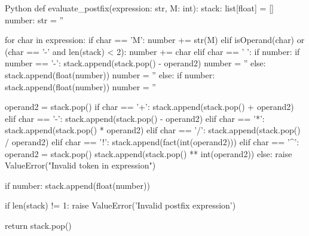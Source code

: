     \begin{code}{Python}
        def evaluate_postfix(expression: str, M: int):
            stack: list[float] = []
            number: str = ''
        
            for char in expression:
                if char == 'M': 
                    number += str(M)
                elif isOperand(char) or (char == '-' and len(stack) < 2):
                    number += char
                elif char == ' ':
                    if number:
                        if number == '-':
                            stack.append(stack.pop() - operand2)
                            number = ''
                        else:
                            stack.append(float(number))
                            number = ''
                else:
                    if number:
                        stack.append(float(number))
                        number = ''
        
                    operand2 = stack.pop()
                    if char == '+':
                        stack.append(stack.pop() + operand2)
                    elif char == '-':
                        stack.append(stack.pop() - operand2)
                    elif char == '*':
                        stack.append(stack.pop() * operand2)
                    elif char == '/':
                        stack.append(stack.pop() / operand2)
                    elif char == '!':
                        stack.append(fact(int(operand2)))
                    elif char == '^':
                        operand2 = stack.pop()
                        stack.append(stack.pop() ** int(operand2))
                    else:
                        raise ValueError("Invalid token in expression")
            
            if number:
                stack.append(float(number))
        
            if len(stack) != 1:
                raise ValueError('Invalid postfix expression')
            
            return stack.pop()
    \end{code}
    \begin{lstlisting}[language=Python, caption=Evaluate Postfix]
    \end{lstlisting}